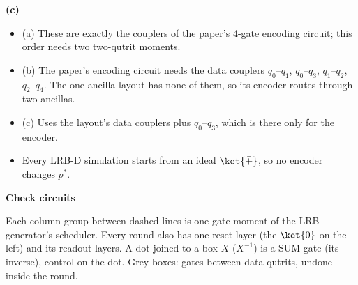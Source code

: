 \documentclass[11pt]{article}
\begin{document}
{\small\bfseries (c)}\hspace{0.5em}{\small Two-ancilla layout: 4 two-qutrit gates on data couplers ($q_0$--$q_3$ is used only here); 3 two-qutrit gate moments}\par\nopagebreak
{}\par\vspace{12pt}
{\small
\begin{itemize}\setlength{\itemsep}{2pt}
\item (a) These are exactly the couplers of the paper's 4-gate encoding circuit; this order needs two two-qutrit moments.
\item (b) The paper's encoding circuit needs the data couplers $q_0$--$q_1$, $q_0$--$q_3$, $q_1$--$q_2$,
  $q_2$--$q_4$. The one-ancilla layout has none of them, so its encoder routes through two ancillas.
\item (c) Uses the layout's data couplers plus $q_0$--$q_3$, which is there only for the encoder.
\item Every LRB-D simulation starts from an ideal $\ket{\bar +}$, so no encoder changes $p^*$.
\end{itemize}}
\clearpage
{\large\bfseries Check circuits}\par
{\small Each column group between dashed lines is one gate moment of the LRB generator's scheduler. Every round also has one reset layer (the $\ket{0}$ on the left) and its readout layers. A dot joined to a box $X$ ($X^{-1}$) is a SUM gate (its inverse), control on the dot. Grey boxes: gates between data qutrits, undone inside the round.}\par\vspace{8pt}
\end{document}
